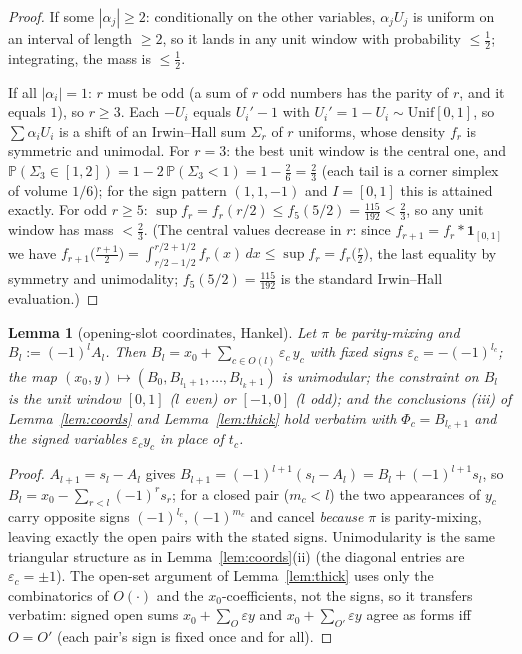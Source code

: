 ﻿\documentclass[11pt]{article}
\newtheorem{lemma}[theorem]{Lemma}
\theoremstyle{remark}
\begin{document}
\begin{proof}
If some $|\alpha_j|\ge2$: conditionally on the other variables, $\alpha_jU_j$ is
uniform on an interval of length $\ge2$, so it lands in any unit window with
probability $\le\tfrac12$; integrating, the mass is $\le\tfrac12$.

If all $|\alpha_i|=1$: $r$ must be odd (a sum of $r$ odd numbers has the parity of
$r$, and it equals $1$), so $r\ge3$. Each $-U_i$ equals $U_i'-1$ with
$U_i'=1-U_i\sim\mathrm{Unif}[0,1]$, so $\sum\alpha_iU_i$ is a shift of an
Irwin--Hall sum $\Sigma_r$ of $r$ uniforms, whose density $f_r$ is symmetric and
unimodal. For $r=3$: the best unit window is the central one, and
$\mathbb{P}(\Sigma_3\in[1,2])=1-2\,\mathbb{P}(\Sigma_3<1)=1-\tfrac26=\tfrac23$
(each tail is a corner simplex of volume $1/6$); for the sign pattern $(1,1,-1)$
and $I=[0,1]$ this is attained exactly. For odd $r\ge5$:
$\sup f_r=f_r(r/2)\le f_5(5/2)=\tfrac{115}{192}<\tfrac23$, so any unit window has
mass $<\tfrac23$. (The central values decrease in $r$: since
$f_{r+1}=f_r\ast\mathbf{1}_{[0,1]}$ we have
$f_{r+1}\big(\tfrac{r+1}{2}\big)=\int_{r/2-1/2}^{r/2+1/2}f_r(x)\,dx\le\sup f_r
=f_r\big(\tfrac{r}{2}\big)$, the last equality by symmetry and unimodality;
$f_5(5/2)=\tfrac{115}{192}$ is the standard Irwin--Hall evaluation.)
\end{proof}

\begin{lemma}[opening-slot coordinates, Hankel]\label{lem:coordsH}
Let $\pi$ be parity-mixing and $B_l:=(-1)^lA_l$. Then
$B_l=x_0+\sum_{c\in O(l)}\varepsilon_c\,y_c$ with fixed signs
$\varepsilon_c=-(-1)^{l_c}$; the map
$(x_0,y)\mapsto(B_0,B_{l_1+1},\dots,B_{l_k+1})$ is unimodular; the constraint on
$B_l$ is the unit window $[0,1]$ ($l$ even) or $[-1,0]$ ($l$ odd); and the
conclusions (iii) of Lemma~\ref{lem:coords} and Lemma~\ref{lem:thick} hold verbatim
with $\Phi_c=B_{l_c+1}$ and the signed variables $\varepsilon_cy_c$ in place of
$t_c$.
\end{lemma}

\begin{proof}
$A_{l+1}=s_l-A_l$ gives $B_{l+1}=(-1)^{l+1}(s_l-A_l)=B_l+(-1)^{l+1}s_l$, so
$B_l=x_0-\sum_{r<l}(-1)^r s_r$; for a closed pair ($m_c<l$) the two appearances of
$y_c$ carry opposite signs $(-1)^{l_c},(-1)^{m_c}$ and cancel \emph{because} $\pi$
is parity-mixing, leaving exactly the open pairs with the stated signs.
Unimodularity is the same triangular structure as in Lemma~\ref{lem:coords}(ii)
(the diagonal entries are $\varepsilon_c=\pm1$). The open-set argument of
Lemma~\ref{lem:thick} uses only the combinatorics of $O(\cdot)$ and the
$x_0$-coefficients, not the signs, so it transfers verbatim: signed open sums
$x_0+\sum_O\varepsilon y$ and $x_0+\sum_{O'}\varepsilon y$ agree as forms iff
$O=O'$ (each pair's sign is fixed once and for all).
\end{proof}
\end{document}
